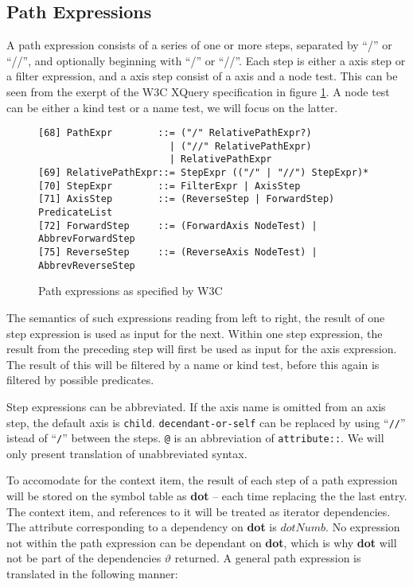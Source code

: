 \subsection{Path Expressions}
\label{sect:trans:TD:pathExprs}
A path expression consists of a series of one or more steps, separated by ``/'' or ``//'', and optionally beginning
with ``/'' or ``//''.  Each step is either a axis step or a filter expression, and a axis step consist of a axis
and a node test. This can be seen from the exerpt of the W3C XQuery specification in figure \ref{fig:trans:TD:pathEBNF}.
A node test can be either a kind test or a name test, we will focus on the latter. 

\begin{figure}[h]
\begin{Verbatim}
[68] PathExpr        ::= ("/" RelativePathExpr?)
                       | ("//" RelativePathExpr)
                       | RelativePathExpr
[69] RelativePathExpr::= StepExpr (("/" | "//") StepExpr)*
[70] StepExpr        ::= FilterExpr | AxisStep
[71] AxisStep        ::= (ReverseStep | ForwardStep) PredicateList
[72] ForwardStep     ::= (ForwardAxis NodeTest) | AbbrevForwardStep
[75] ReverseStep     ::= (ReverseAxis NodeTest) | AbbrevReverseStep
\end{Verbatim}
\label{fig:trans:TD:pathEBNF}
\caption{Path expressions as specified by W3C\cite{w3c00}}
\end{figure}
The semantics of such expressions reading from left to right, the result of one step expression is used as input
for the next. Within one step expression, the result from the preceding step will first be used as input for the
axis expression. The result of this will be filtered by a name or kind test, before this again is filtered by
possible predicates.

Step expressions can be abbreviated. If the axis name is omitted from an axis step, the default axis is
\texttt{child}. \texttt{decendant-or-self} can be replaced by using ``\texttt{//}'' istead of ``\texttt{/}''
between the steps. \texttt{@} is an abbreviation of \texttt{attribute::}. We will only present translation of
unabbreviated syntax.

To accomodate for the context item, the result of each step of a path expression will be stored on the symbol
table as \textbf{dot} -- each time replacing the the last entry. The context item, and references to it will be
treated as iterator dependencies. The attribute corresponding to a dependency on \textbf{dot} is $dotNumb$. No
expression not within the path expression can be dependant on \textbf{dot}, which is why \textbf{dot} will not be
part of the dependencies $\vartheta$ returned. A general path expression is translated in the following manner:

